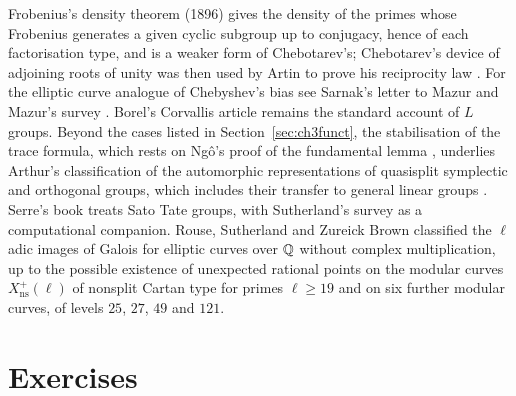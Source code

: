 Frobenius's density theorem (1896) gives the density of the primes whose Frobenius generates a given cyclic subgroup up to conjugacy, hence of each factorisation type, and is a weaker form of Chebotarev's; Chebotarev's device of adjoining roots of unity was then used by Artin to prove his reciprocity law \cite{artin1927}. For the elliptic curve analogue of Chebyshev's bias see Sarnak's letter to Mazur \cite{sarnak2007} and Mazur's survey \cite{mazur2008}. Borel's Corvallis article \cite{borel1979} remains the standard account of $L$ groups. Beyond the cases listed in Section~\ref{sec:ch3funct}, the stabilisation of the trace formula, which rests on Ngô's proof of the fundamental lemma \cite{ngo2010}, underlies Arthur's classification of the automorphic representations of quasisplit symplectic and orthogonal groups, which includes their transfer to general linear groups \cite{arthur2013}. Serre's book \cite{serre2012} treats Sato Tate groups, with Sutherland's survey \cite{sutherland2019} as a computational companion. Rouse, Sutherland and Zureick Brown \cite{rszb2022} classified the $\ell$ adic images of Galois for elliptic curves over $\mathbb{Q}$ without complex multiplication, up to the possible existence of unexpected rational points on the modular curves $X_{\mathrm{ns}}^+(\ell)$ of nonsplit Cartan type for primes $\ell\ge19$ and on six further modular curves, of levels $25$, $27$, $49$ and $121$.

\section{Exercises}

